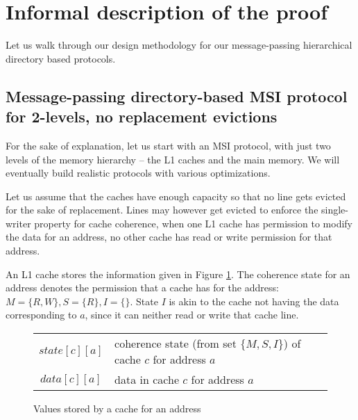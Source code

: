 \section{Informal description of the proof}
\label{sec:informal-proof}

\newcommand{\msg}[5]{\text{$#1 \langle #2 \rightarrow #3, #4, #5 \rangle$}}
\newcommand{\Req}[4]{\msg{Req}{#1}{#2}{#3}{#4}}
\newcommand{\Resp}[4]{\msg{Resp}{#1}{#2}{#3}{#4}}
\newcommand{\Data}[4]{\msg{Data}{#1}{#2}{#3}{#4}}
\newcommand{\Mesg}[4]{\msg{Mesg}{#1}{#2}{#3}{#4}}
\newcommand{\FirstInv}{\emph{FirstInv}}
%

Let us walk through our design methodology for our message-passing hierarchical
directory based protocols.

\subsection{Message-passing directory-based MSI protocol for 2-levels, no
replacement evictions}
For the sake of explanation, let us start with an MSI protocol, with just two
levels of the memory hierarchy -- the L1 caches and the main memory. We will
eventually build realistic protocols with various optimizations.

Let us assume that the caches have enough capacity so that no line gets evicted
for the sake of replacement. Lines may however get evicted to enforce the
single-writer property for cache coherence, \ie when one L1 cache has
permission to modify the data for an address, no other cache has read or write
permission for that address.
 
An L1 cache stores the information given in Figure \ref{table:lineinfo}. The
coherence state for an address denotes the permission that a cache has for the
address: $M = \{R, W\}, S = \{R\}, I = \{\}$. State $I$ is akin to the cache not
having the data corresponding to $a$, since it can neither read or write that
cache line.

\begin{figure}
\begin{tabularx}{\linewidth}{|cX|}
\hline
$state[c][a]$ & coherence state (from set $\{M, S, I\}$) of cache $c$ for
address $a$\\
$data[c][a]$ & data in cache $c$ for address $a$\\
\hline
\end{tabularx}
\caption{Values stored by a cache for an address}
\label{table:lineinfo}
\end{figure}

